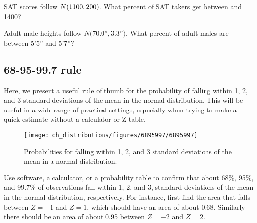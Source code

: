\begin{exercisewrap}
\begin{nexercise}
SAT scores follow $N(1100{}, 200{})$.
What percent of SAT takers get between \satmean{} and
1400?\footnotemark
\end{nexercise}
\end{exercisewrap}

\begin{exercisewrap}
\begin{nexercise}
Adult male heights follow $N(70.0$''$, 3.3$''$)$.
What percent of adult males are between 5'5''
and 5'7''?\footnotemark{}
\end{nexercise}
\end{exercisewrap}


\D{\newpage}

\subsection{68-95-99.7 rule}

Here, we present a useful rule of thumb for the probability of falling within 1, 2, and 3 standard deviations of the mean in the normal distribution. This will be useful in a wide range of practical settings, especially when trying to make a quick estimate without a calculator or Z-table.

\begin{figure}[hht]
\centering
\texttt{[image: ch\_distributions/figures/6895997/6895997]}
\caption{Probabilities for falling within 1, 2, and 3 standard deviations of the mean in a normal distribution.}
\label{6895997}
\end{figure}

\begin{exercisewrap}
\begin{nexercise}
Use software, a calculator, or a probability table
to confirm that about 68\%, 95\%, and 99.7\%
of observations fall within 1, 2, and 3, standard deviations
of the mean in the normal distribution, respectively.
For instance, first find the area that falls between $Z=-1$
and $Z=1$, which should have an area of about 0.68.
Similarly there should be an area of about 0.95 between
$Z=-2$ and $Z=2$.\footnotemark{}
\end{nexercise}
\end{exercisewrap}

